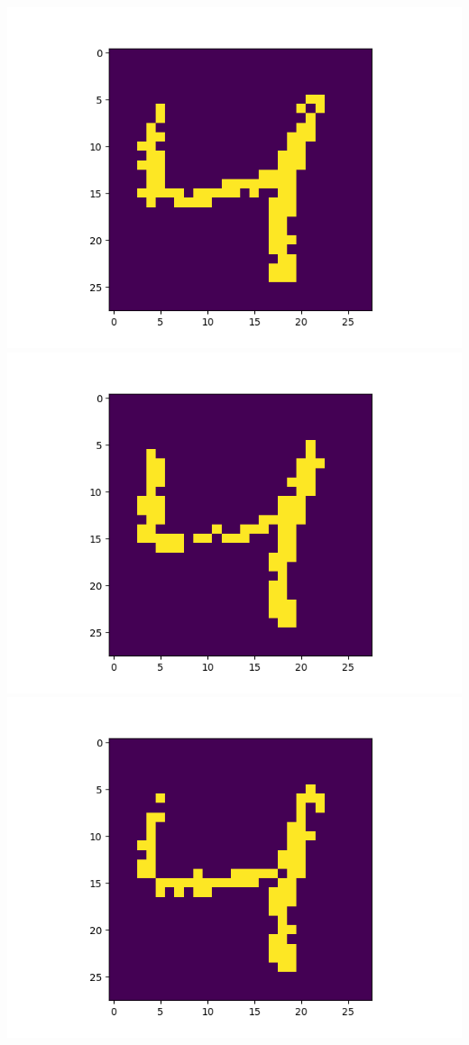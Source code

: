 \includegraphics[scale=0.2]{./bilder/comparison/prob/46}
\includegraphics[scale=0.2]{./bilder/comparison/prob/47}
\includegraphics[scale=0.2]{./bilder/comparison/prob/48}
